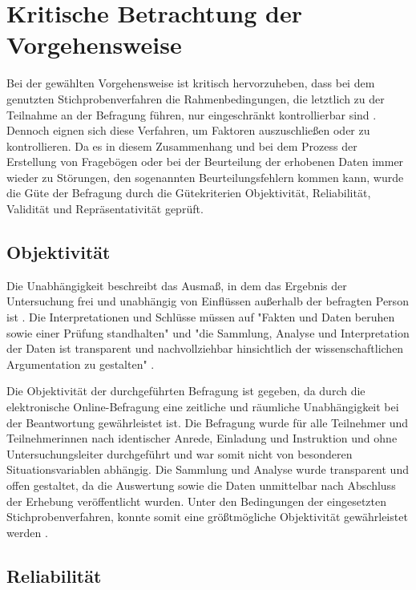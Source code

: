 \section{Kritische Betrachtung der Vorgehensweise}

Bei der gewählten Vorgehensweise ist kritisch hervorzuheben, dass bei dem genutzten Stichprobenverfahren die Rahmenbedingungen, die letztlich zu der Teilnahme an der Befragung führen, nur eingeschränkt kontrollierbar sind \cite[:36]{Eichhorn_2004}. Dennoch eignen sich diese Verfahren, um Faktoren auszuschließen oder zu kontrollieren. Da es in diesem Zusammenhang und bei dem Prozess der Erstellung von Fragebögen oder bei der Beurteilung der erhobenen Daten immer wieder zu Störungen, den sogenannten Beurteilungsfehlern kommen kann, wurde die Güte der Befragung durch die Gütekriterien Objektivität, Reliabilität, Validität und Repräsentativität geprüft.

\subsection{Objektivität}

Die Unabhängigkeit beschreibt das Ausmaß, in dem das Ergebnis der Untersuchung frei und unabhängig von Einflüssen außerhalb der befragten Person ist \cite{Rost_2004}. Die Interpretationen und Schlüsse müssen auf "Fakten und Daten beruhen sowie einer Prüfung standhalten" und "die Sammlung, Analyse und Interpretation der Daten ist transparent und nachvollziehbar hinsichtlich der wissenschaftlichen Argumentation zu gestalten" \cite{Bargheer_2015}.

Die Objektivität der durchgeführten Befragung ist gegeben, da durch die elektronische Online-Befragung eine zeitliche und räumliche Unabhängigkeit bei der Beantwortung gewährleistet ist. Die Befragung wurde für alle Teilnehmer und Teilnehmerinnen nach identischer Anrede, Einladung und Instruktion und ohne Untersuchungsleiter durchgeführt und war somit nicht von besonderen Situationsvariablen abhängig. Die Sammlung und Analyse wurde transparent und offen gestaltet, da die Auswertung sowie die Daten unmittelbar nach Abschluss der Erhebung veröffentlicht wurden. Unter den Bedingungen der eingesetzten Stichprobenverfahren, konnte somit eine größtmögliche Objektivität gewährleistet werden \cite[:40]{Eichhorn_2004}.

\subsection{Reliabilität}

